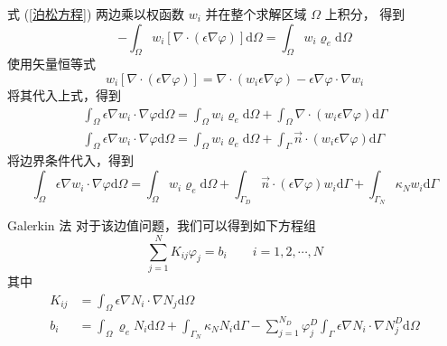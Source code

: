 \begin{solution}
    式 (\ref{泊松方程}) 两边乘以权函数 $w_i$ 并在整个求解区域 $\Omega$ 上积分，
    得到
    \begin{equation*}
        -\int_{\Omega}w_i[\nabla\cdot(\epsilon\nabla\varphi)]\text{d}\Omega
        = \int_{\Omega}w_i\varrho_e\text{d}\Omega
    \end{equation*}
    使用矢量恒等式
    \begin{equation*}
        w_i[\nabla\cdot(\epsilon\nabla\varphi)]
        =\nabla\cdot(w_i\epsilon\nabla\varphi)
        -\epsilon\nabla\varphi\cdot\nabla w_i
    \end{equation*}
    将其代入上式，得到
    \begin{gather*}
        \int_{\Omega}\epsilon\nabla w_i\cdot\nabla \varphi\text{d}\Omega
        =\int_{\Omega}w_i\varrho_e\text{d}\Omega
        +\int_{\Omega}\nabla\cdot(w_i\epsilon\nabla\varphi)\text{d}\Gamma\\
        \int_{\Omega}\epsilon\nabla w_i\cdot\nabla \varphi\text{d}\Omega
        =\int_{\Omega}w_i\varrho_e\text{d}\Omega
        +\int_{\Gamma}\vec{n}\cdot(w_i\epsilon\nabla\varphi)\text{d}\Gamma
    \end{gather*}
    将边界条件代入，得到
    \begin{equation*}
        \int_{\Omega}\epsilon\nabla w_i\cdot\nabla \varphi\text{d}\Omega
        =\int_{\Omega}w_i\varrho_e\text{d}\Omega
        +\int_{\Gamma_D}\vec{n}\cdot(\epsilon\nabla\varphi)w_i\text{d}\Gamma
        +\int_{\Gamma_N}\kappa_N w_i\text{d}\Gamma
    \end{equation*}
\end{solution}

\begin{theorem}{Galerkin 法}
    对于该边值问题，我们可以得到如下方程组
    \begin{equation}
        \sum_{j=1}^{N} K_{ij} \varphi_j = b_i \qquad i = 1, 2, \cdots, N
    \end{equation}
    其中
    \begin{align}
        \label{标量场有限元公式-1}
        K_{ij} &= 
        \int_{\Omega}\epsilon\nabla N_i\cdot\nabla N_j\text{d}\Omega \\
        \label{标量场有限元公式-2}
        b_i &= 
        \int_{\Omega}\varrho_e N_i\text{d}\Omega
        +\int_{\Gamma_N}\kappa_N N_i\text{d}\Gamma
        -\sum_{j=1}^{N_D}\varphi^D_j\int_{\Gamma}\epsilon\nabla N_i
        \cdot\nabla N_j^D\text{d}\Omega
    \end{align}
\end{theorem}

